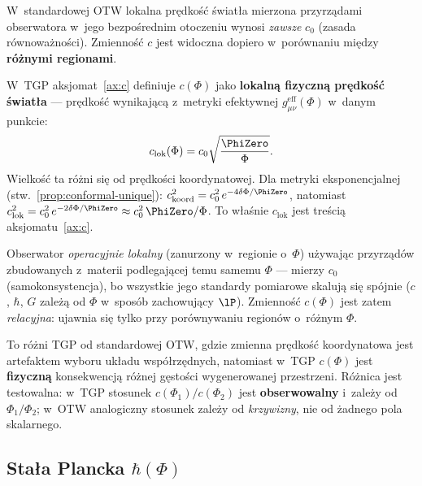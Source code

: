 \begin{remark}\label{rem:c-interpretacja}
W~standardowej OTW lokalna pr\k{e}dko\'s\'c \'swiat\l{}a
mierzona przyrz\k{a}dami obserwatora w~jego bezpo\'srednim
otoczeniu wynosi \emph{zawsze} $c_0$ (zasada r\'ownowa\.zno\'sci).
Zmienno\'s\'c $c$ jest widoczna dopiero w~por\'ownaniu
mi\k{e}dzy \textbf{r\'o\.znymi regionami}.

W~TGP aksjomat~\ref{ax:c} definiuje $c(\Phi)$ jako
\textbf{lokaln\k{a} fizyczn\k{a} pr\k{e}dko\'s\'c \'swiat\l{}a}
--- pr\k{e}dko\'s\'c wynikaj\k{a}c\k{a} z~metryki efektywnej
$g_{\mu\nu}^{\mathrm{eff}}(\Phi)$ w~danym punkcie:
\begin{equation}\label{eq:c-lok}
    c_{\mathrm{lok}}(\Phi)
    = c_0\sqrt{\frac{\PhiZero}{\Phi}}.
\end{equation}
Wielko\'s\'c ta r\'o\.zni si\k{e} od pr\k{e}dko\'sci
koordynatowej. Dla metryki eksponencjalnej
(stw.~\ref{prop:conformal-unique}):
$c_{\mathrm{koord}}^2 = c_0^2\,e^{-4\delta\Phi/\PhiZero}$,
natomiast $c_{\mathrm{lok}}^2 = c_0^2\,e^{-2\delta\Phi/\PhiZero}
\approx c_0^2\,\PhiZero/\Phi$.
To w\l{}a\'snie $c_{\mathrm{lok}}$ jest tre\'sci\k{a}
aksjomatu~\ref{ax:c}.

Obserwator \emph{operacyjnie lokalny} (zanurzony w~regionie o~$\Phi$)
u\.zywaj\k{a}c przyrz\k{a}d\'ow zbudowanych z~materii
podlegaj\k{a}cej temu samemu $\Phi$ --- mierzy $c_0$
(samokonsystencja), bo wszystkie jego standardy pomiarowe
skaluj\k{a} si\k{e} sp\'ojnie ($c$, $\hbar$, $G$ zale\.z\k{a}
od $\Phi$ w~spos\'ob zachowuj\k{a}cy $\lP$).
Zmienno\'s\'c $c(\Phi)$ jest zatem
\emph{relacyjna}: ujawnia si\k{e} tylko przy por\'ownywaniu
region\'ow o~r\'o\.znym $\Phi$.

To r\'o\.zni TGP od standardowej OTW, gdzie zmienna
pr\k{e}dko\'s\'c koordynatowa jest artefaktem wyboru
uk\l{}adu wsp\'o\l{}rz\k{e}dnych, natomiast w~TGP $c(\Phi)$ jest
\textbf{fizyczn\k{a}} konsekwencj\k{a} r\'o\.znej
g\k{e}sto\'sci wygenerowanej przestrzeni. R\'o\.znica
jest testowalna: w~TGP stosunek $c(\Phi_1)/c(\Phi_2)$
jest \textbf{obserwowalny} i~zale\.zy od $\Phi_1/\Phi_2$;
w~OTW analogiczny stosunek zale\.zy od \emph{krzywizny},
nie od \.zadnego pola skalarnego.
\end{remark}

\subsection{Sta\l{}a Plancka $\hbar(\Phi)$}\label{ssec:hbar}

